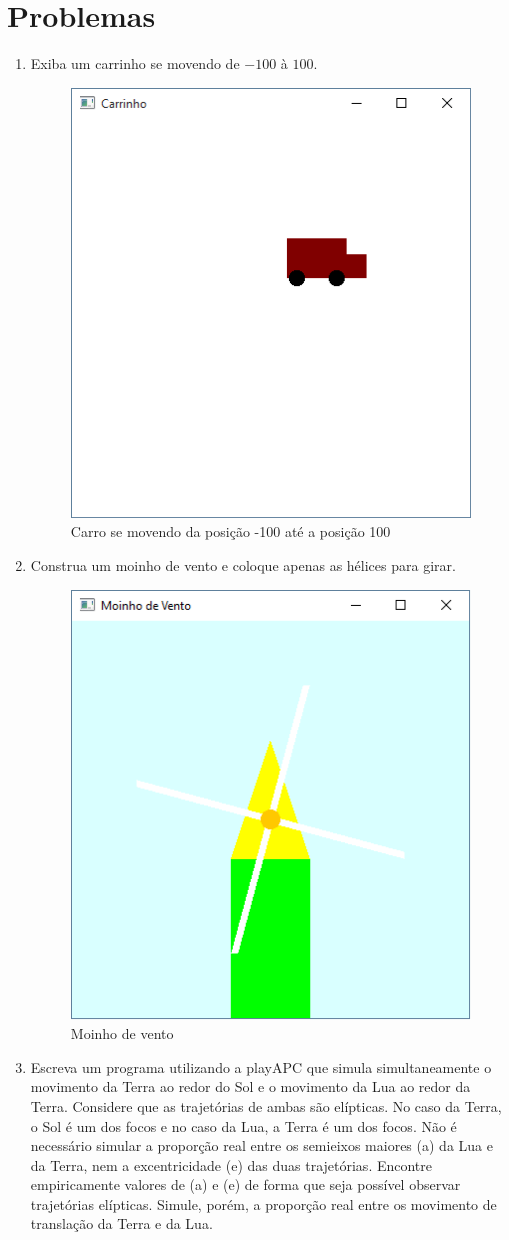 \section*{Problemas}
\begin{enumerate}

\item
  Exiba um carrinho se movendo de $-100$ à $100$.
  \label{ex:cap01_ex6}

  \begin{figure}[H]
    \centerline{\includegraphics[width=.4\textwidth]{img/cap1_ex5.png}}
    \caption{Carro se movendo da posição -100 até a posição 100}
    \label{fig:cap01_ex6}
  \end{figure}

\item
  Construa um moinho de vento e coloque apenas as hélices para girar.
  \label{ex:cap01_ex7}

  \begin{figure}[H]
    \centerline{\includegraphics[width=.4\textwidth]{img/cap1_ex7.png}}
    \caption{Moinho de vento}
    \label{fig:cap01_ex7}
  \end{figure}

\item
  Escreva um programa utilizando a playAPC que simula simultaneamente o movimento da Terra ao redor do Sol e o movimento da Lua ao redor da Terra. Considere que as trajetórias de ambas são elípticas. No caso da Terra, o Sol é um dos focos e no caso da Lua, a Terra é um dos focos. Não é necessário simular a proporção real entre os semieixos maiores (a) da Lua e da Terra, nem a excentricidade (e) das duas trajetórias. Encontre empiricamente valores de (a) e (e) de forma que seja possível observar trajetórias elípticas. Simule, porém, a proporção real entre os movimento de translação da Terra e da Lua.
  \label{ex:cap01_ex24}


\end{enumerate}

